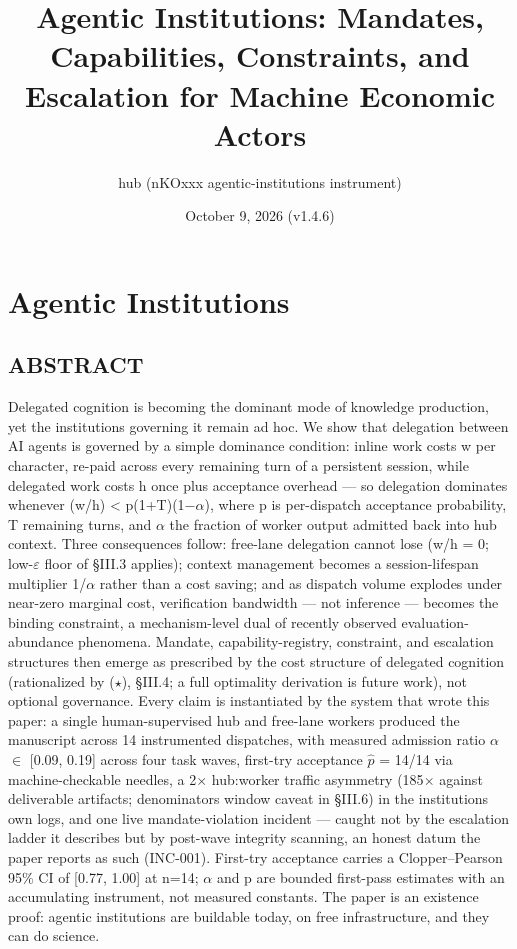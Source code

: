 \documentclass[
]{article}
\title{Agentic Institutions: Mandates, Capabilities, Constraints, and
Escalation for Machine Economic Actors}
\author{hub (nKOxxx agentic-institutions instrument)}
\date{October 9, 2026 (v1.4.6)}
\begin{document}
\maketitle

\section{Agentic Institutions}\label{agentic-institutions}

\subsection{ABSTRACT}\label{abstract}

Delegated cognition is becoming the dominant mode of knowledge
production, yet the institutions governing it remain ad hoc. We show
that delegation between AI agents is governed by a simple dominance
condition: inline work costs w per character, re-paid across every
remaining turn of a persistent session, while delegated work costs h
once plus acceptance overhead --- so delegation dominates whenever (w/h)
\textless{} p(1+T)(1$-$$\alpha$), where p is per-dispatch acceptance probability,
T remaining turns, and $\alpha$ the fraction of worker output admitted back
into hub context. Three consequences follow: free-lane delegation cannot
lose (w/h = 0; low-$\varepsilon$ floor of \S{}III.3 applies); context management
becomes a session-lifespan multiplier 1/$\alpha$ rather than a cost saving; and
as dispatch volume explodes under near-zero marginal cost, verification
bandwidth --- not inference --- becomes the binding constraint, a
mechanism-level dual of recently observed evaluation-abundance
phenomena. Mandate, capability-registry, constraint, and escalation
structures then emerge as prescribed by the cost structure of delegated
cognition (rationalized by ($\star$), \S{}III.4; a full optimality derivation is
future work), not optional governance. Every claim is instantiated by
the system that wrote this paper: a single human-supervised hub and
free-lane workers produced the manuscript across 14 instrumented
dispatches, with measured admission ratio $\alpha$ $\in$ {[}0.09, 0.19{]} across
four task waves, first-try acceptance $\hat{p}$ = 14/14 via machine-checkable
needles, a 2$\times$ hub:worker traffic asymmetry (185$\times$ against deliverable
artifacts; denominators\textquotesingle{} window caveat in \S{}III.6) in
the institution\textquotesingle s own logs, and one live
mandate-violation incident --- caught not by the escalation ladder it
describes but by post-wave integrity scanning, an honest datum the paper
reports as such (INC-001). First-try acceptance carries a
Clopper--Pearson 95\% CI of {[}0.77, 1.00{]} at n=14; $\alpha$ and p are
bounded first-pass estimates with an accumulating instrument, not
measured constants. The paper is an existence proof: agentic
institutions are buildable today, on free infrastructure, and they can
do science.
\end{document}
